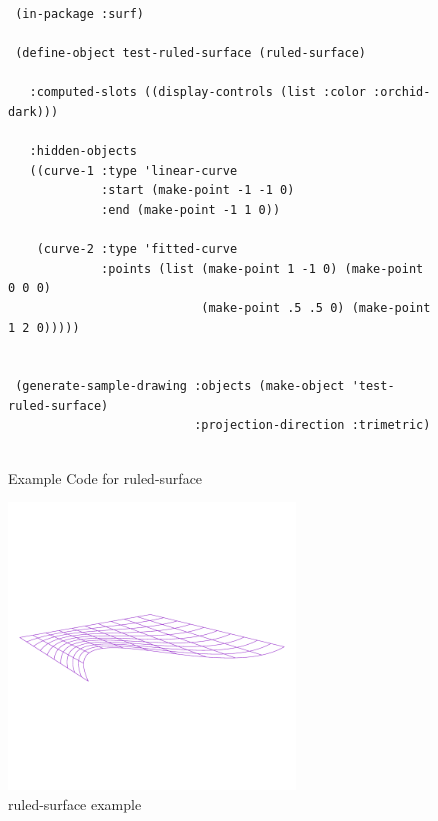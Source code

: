 \documentclass [11pt]{book}
\begin{document}
\begin{itemize}
\begin{figure}
\begin{lrbox}{\boxedverb}
\begin{minipage}{\linewidth}
{\begin{verbatim}
 (in-package :surf)

 (define-object test-ruled-surface (ruled-surface)
  
   :computed-slots ((display-controls (list :color :orchid-dark)))

   :hidden-objects
   ((curve-1 :type 'linear-curve
             :start (make-point -1 -1 0)
             :end (make-point -1 1 0))
   
    (curve-2 :type 'fitted-curve
             :points (list (make-point 1 -1 0) (make-point 0 0 0) 
                           (make-point .5 .5 0) (make-point 1 2 0)))))


 (generate-sample-drawing :objects (make-object 'test-ruled-surface)
                          :projection-direction :trimetric)


\end{verbatim}}
\end{minipage}
\end{lrbox}
\fbox{\usebox{\boxedverb}}

\caption{Example Code for ruled-surface}

\label{fig:example-code-ruled-surface}

\end{figure}

\begin{figure}
\begin{center}
\includegraphics[width=3in,height=3in]{../images/example-ruled-surface.pdf}
\end{center}

\caption{ruled-surface example}

\label{fig:ruled-surface}

\end{figure}






\end{itemize}
\end{document}
